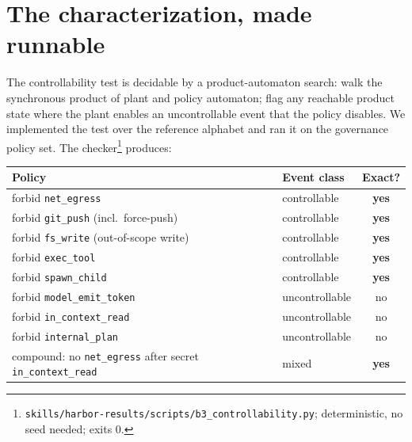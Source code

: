 \documentclass[11pt,a4paper]{article}  \usepackage{mdframed} \usepackage{graphicx} \usepackage{tabularx}
\begin{document}
\section{The characterization, made runnable}\label{sec:table} The controllability test is decidable by a product-automaton
search: walk the synchronous product of plant and policy automaton; flag any reachable product state where the plant enables
an uncontrollable event that the policy disables. We implemented the test over the reference alphabet and ran it on the
governance policy set. The checker\footnote{\texttt{skills/\allowbreak harbor-results/\allowbreak scripts/\allowbreak b3\_\allowbreak controllability.py}; deterministic, no
seed needed; exits 0.} produces:

\begin{center} \begin{tabularx}{\linewidth}{@{}>{\raggedright\arraybackslash}Xlc@{}} \toprule Policy & Event class & Exact? \\ \midrule forbid
\texttt{net\_\allowbreak egress} & controllable & \textbf{yes} \\ forbid \texttt{git\_\allowbreak push} (incl.\ force-push) & controllable
& \textbf{yes} \\ forbid \texttt{fs\_\allowbreak write} (out-of-scope write) & controllable & \textbf{yes} \\
forbid \texttt{exec\_\allowbreak tool} & controllable & \textbf{yes} \\ forbid \texttt{spawn\_\allowbreak child} & controllable &
\textbf{yes} \\ forbid \texttt{model\_\allowbreak emit\_\allowbreak token} & uncontrollable & no \\ forbid
\texttt{in\_\allowbreak context\_\allowbreak read} & uncontrollable & no \\ forbid \texttt{internal\_\allowbreak plan} &
uncontrollable & no \\ \midrule compound: no \texttt{net\_\allowbreak egress} after secret \texttt{in\_\allowbreak context\_\allowbreak read} &
mixed & \textbf{yes} \\ \bottomrule \end{tabularx} \end{center}
\end{document}
